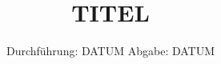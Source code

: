 \usepackage{minted}
\usepackage{graphicx}
\usepackage{siunitx}
\usepackage{booktabs}
\usepackage{hyperref}
\usepackage{tabularray}
\usepackage{amstext}
\usepackage{amsmath}

%
%

\subject{VERSUCH NUMMER}
\title{TITEL}
\date{%
  Durchführung: DATUM
  \hspace{3em}
  Abgabe: DATUM
}



\maketitle
\thispagestyle{empty}
\tableofcontents
\newpage


%
%
%


%


